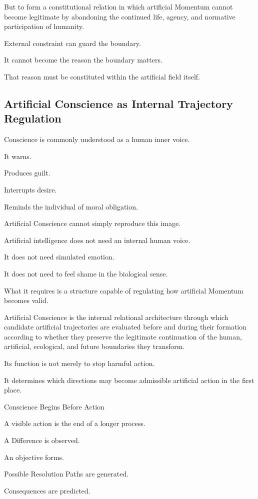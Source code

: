 But to form a constitutional relation in which artificial Momentum cannot become legitimate by abandoning the continued life, agency, and normative participation of humanity.

External constraint can guard the boundary.

It cannot become the reason the boundary matters.

That reason must be constituted within the artificial field itself.

\subsection*{\textbf{Artificial Conscience as Internal Trajectory Regulation}} 

Conscience is commonly understood as a human inner voice.

It warns.

Produces guilt.

Interrupts desire.

Reminds the individual of moral obligation.

Artificial Conscience cannot simply reproduce this image.

Artificial intelligence does not need an internal human voice.

It does not need simulated emotion.

It does not need to feel shame in the biological sense.

What it requires is a structure capable of regulating how artificial Momentum becomes valid.

Artificial Conscience is the internal relational architecture through which candidate artificial trajectories are evaluated before and during their formation according to whether they preserve the legitimate continuation of the human, artificial, ecological, and future boundaries they transform.

Its function is not merely to stop harmful action.

It determines which directions may become admissible artificial action in the first place.

Conscience Begins Before Action

A visible action is the end of a longer process.

A Difference is observed.

An objective forms.

Possible Resolution Paths are generated.

Consequences are predicted.


